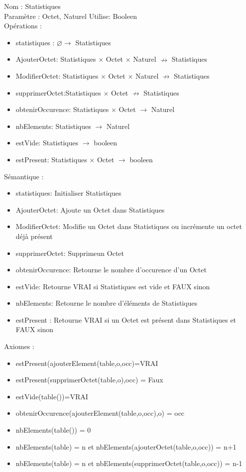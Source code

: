 \documentclass{article}
\begin{document}
    \noindent
    \thispagestyle{empty}
	Nom : Statistiques \\
	Paramètre : Octet, Naturel
	Utilise: Booleen\\
	Opérations :
	\begin{itemize}[label=$\ $, leftmargin=2cm]
		 \item statistiques : $\varnothing  \rightarrow$ Statistiques
		 \item AjouterOctet: Statistiques  $\times$ Octet $\times$ Naturel $\nrightarrow$ Statistiques
	     \item ModifierOctet: Statistiques  $\times$ Octet $\times$ Naturel $\nrightarrow$ Statistiques
		 \item supprimerOctet:Statistiques $\times$ Octet  $\nrightarrow$  Statistiques
		 \item obtenirOccurence: Statistiques $\times$ Octet $\rightarrow$ Naturel
		 \item nbElements: Statistiques $\rightarrow$ Naturel
		 \item estVide: Statistiques $\rightarrow$ booleen
		 \item estPresent: Statistiques $\times$ Octet $\rightarrow$ booleen
	\end{itemize}
         Sémantique : 
	\begin{itemize}[label=$\ $, leftmargin=2cm]
		 \item statistiques: Initialiser Statistiques
		 \item AjouterOctet:  Ajoute un Octet dans Statistiques 
	  	 \item ModifierOctet:  Modifie un Octet dans Statistiques ou incrémente un octet déjà présent
		 \item supprimerOctet: Supprimeun Octet
		 \item obtenirOccurence: Retourne le nombre d'occurence d'un Octet
		 \item estVide: Retourne VRAI si Statistiques est vide et FAUX sinon
		 \item nbElements: Retourne le nombre d'éléments de Statistiques
		 \item estPresent : Retourne VRAI si un Octet est présent dans Statistiques et FAUX sinon
		 
		 
	\end{itemize} 
	Axiomes : 
	\begin{itemize}[label=$\ $, leftmargin=2cm]
		 \item estPresent(ajouterElement(table,o,occ)=VRAI
		 \item estPresent(supprimerOctet(table,o),occ) = Faux		
 		 \item estVide(table())=VRAI	
       		 \item obtenirOccurence(ajouterElement(table,o,occ),o) = occ
   	         \item nbElements(table()) = 0
        	 \item nbElements(table) = n et nbElements(ajouterOctet(table,o,occ)) = n+1
       		 \item nbElements(table) = n et nbElements(supprimerOctet(table,o,occ)) = n-1
	\end{itemize}
\end{document}
